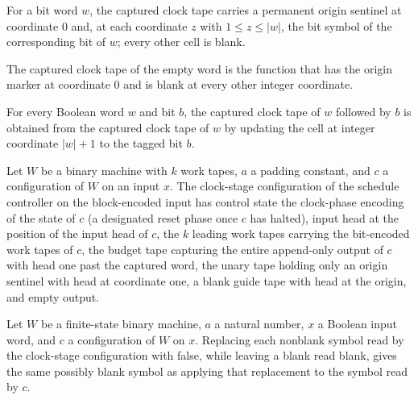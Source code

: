 \begin{definition}
\label{Complexity.clockTape}
\leanok
{}
For a bit word $w$, the captured clock tape carries a permanent origin sentinel at
coordinate $0$ and, at each coordinate $z$ with $1 \le z \le |w|$, the bit symbol of
the corresponding bit of $w$; every other cell is blank.
\end{definition}

\begin{lemma}
\label{Complexity.clockTape_nil}
\leanok
{}
The captured clock tape of the empty word is the function that has the origin marker at
coordinate $0$ and is blank at every other integer coordinate.
\end{lemma}

\begin{lemma}
\label{Complexity.clockTape_append}
\leanok
{}
For every Boolean word $w$ and bit $b$, the captured clock tape of $w$ followed by $b$
is obtained from the captured clock tape of $w$ by updating the cell at integer
coordinate $|w|+1$ to the tagged bit $b$.
\end{lemma}

\begin{definition}
\label{Complexity.clockStageCfg}
\leanok
{}
Let $W$ be a binary machine with $k$ work tapes, $a$ a padding constant, and $c$ a
configuration of $W$ on an input $x$.  The clock-stage configuration of the schedule
controller on the block-encoded input has control state the clock-phase encoding of
the state of $c$ (a designated reset phase once $c$ has halted), input head at the
position of the input head of $c$, the $k$ leading work tapes carrying the
bit-encoded work tapes of $c$, the budget tape capturing the entire append-only
output of $c$ with head one past the captured word, the unary tape holding only an
origin sentinel with head at coordinate one, a blank guide tape with head at the
origin, and empty output.
\end{definition}

\begin{lemma}
\label{Complexity.clockStageCfg_input}
\leanok
{}
Let $W$ be a finite-state binary machine, $a$ a natural number, $x$ a Boolean input
word, and $c$ a configuration of $W$ on $x$. Replacing each nonblank symbol read by the
clock-stage configuration with false, while leaving a blank read blank, gives the same
possibly blank symbol as applying that replacement to the symbol read by $c$.
\end{lemma}

